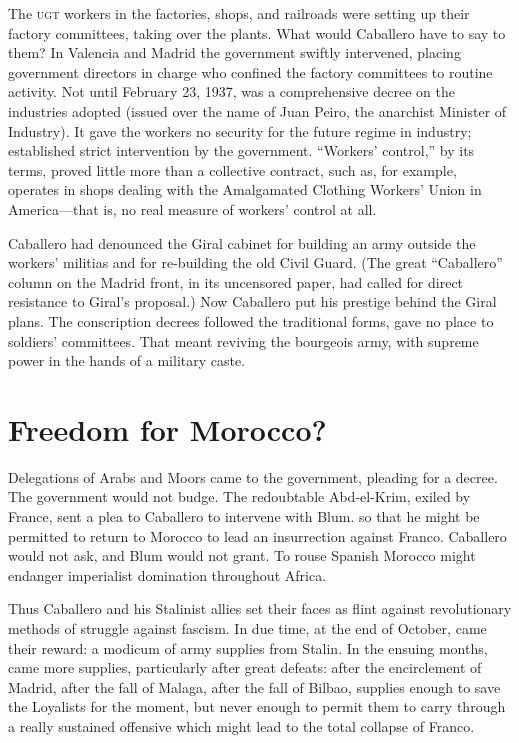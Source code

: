 The \textsc{ugt} workers in the factories, shops, and railroads were setting up their factory committees, taking over the plants. What would Caballero have to say to them? In Valencia and Madrid the government swiftly intervened, placing government directors in charge who confined the factory committees to routine activity. Not until February 23, 1937, was a comprehensive decree on the industries adopted (issued over the name of Juan Peiro, the anarchist Minister of Industry). It gave the workers no security for the future regime in industry; established strict intervention by the government. ``Workers’ control,'' by its terms, proved little more than a collective contract, such as, for example, operates in shops dealing with the {Amalgamated Clothing Workers’ Union} in America---that is, no real measure of workers’ control at all.

Caballero had denounced the Giral cabinet for building an army outside the workers’ militias and for re-building the old Civil Guard. (The great ``Caballero'' column on the Madrid front, in its uncensored paper, had called for direct resistance to Giral’s proposal.) Now Caballero put his prestige behind the Giral plans. The conscription decrees followed the traditional forms, gave no place to soldiers’ committees. That meant reviving the bourgeois army, with supreme power in the hands of a military caste.

\section{Freedom for Morocco?}

Delegations of Arabs and Moors came to the government, pleading for a decree. The government would not budge. The redoubtable Abd-el-Krim, exiled by France, sent a plea to Caballero to intervene with Blum. so that he might be permitted to return to Morocco to lead an insurrection against Franco. Caballero would not ask, and Blum would not grant. To rouse Spanish Morocco might endanger imperialist domination throughout Africa.

Thus Caballero and his Stalinist allies set their faces as flint against revolutionary methods of struggle against fascism. In due time, at the end of October, came their reward: a modicum of army supplies from Stalin. In the ensuing months, came more supplies, particularly after great defeats: after the encirclement of Madrid, after the fall of Malaga, after the fall of Bilbao, supplies enough to save the Loyalists for the moment, but never enough to permit them to carry through a really sustained offensive which might lead to the total collapse of Franco.


